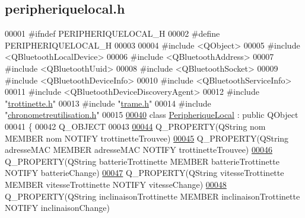 \hypertarget{peripheriquelocal_8h_source}{}\subsection{peripheriquelocal.\+h}
\label{peripheriquelocal_8h_source}

\begin{DoxyCode}
00001 \textcolor{preprocessor}{#ifndef PERIPHERIQUELOCAL\_H}
00002 \textcolor{preprocessor}{#define PERIPHERIQUELOCAL\_H}
00003 
00004 \textcolor{preprocessor}{#include <QObject>}
00005 \textcolor{preprocessor}{#include <QBluetoothLocalDevice>}
00006 \textcolor{preprocessor}{#include <QBluetoothAddress>}
00007 \textcolor{preprocessor}{#include <QBluetoothUuid>}
00008 \textcolor{preprocessor}{#include <QBluetoothSocket>}
00009 \textcolor{preprocessor}{#include <QBluetoothDeviceInfo>}
00010 \textcolor{preprocessor}{#include <QBluetoothServiceInfo>}
00011 \textcolor{preprocessor}{#include <QBluetoothDeviceDiscoveryAgent>}
00012 \textcolor{preprocessor}{#include "\hyperlink{trottinette_8h}{trottinette.h}"}
00013 \textcolor{preprocessor}{#include "\hyperlink{trame_8h}{trame.h}"}
00014 \textcolor{preprocessor}{#include "\hyperlink{chronometreutilisation_8h}{chronometreutilisation.h}"}
00015 
\hyperlink{class_peripherique_local}{00040} \textcolor{keyword}{class }\hyperlink{class_peripherique_local}{PeripheriqueLocal} : \textcolor{keyword}{public} QObject
00041 \{
00042     Q\_OBJECT
00043 
\hyperlink{class_peripherique_local_a16dcebf91bf74b8e3f1c2d90b77dda29}{00044}     Q\_PROPERTY(QString nom MEMBER nom NOTIFY trottinetteTrouvee)
\hyperlink{class_peripherique_local_a76ccdcef703e7aff1f6f66dc615feba7}{00045}     Q\_PROPERTY(QString adresseMAC MEMBER adresseMAC NOTIFY trottinetteTrouvee)
\hyperlink{class_peripherique_local_a7feac59a6fbe481321aa1734d13f05c2}{00046}     Q\_PROPERTY(QString batterieTrottinette MEMBER batterieTrottinette NOTIFY batterieChange)
\hyperlink{class_peripherique_local_aa0a0ebf6468e8a2c3a15828122ee830a}{00047}     Q\_PROPERTY(QString vitesseTrottinette MEMBER vitesseTrottinette NOTIFY vitesseChange)
\hyperlink{class_peripherique_local_ab85a254ce801dcdebd6be972aea0638b}{00048}     Q\_PROPERTY(QString inclinaisonTrottinette MEMBER inclinaisonTrottinette NOTIFY inclinaisonChange)

\end{DoxyCode}
